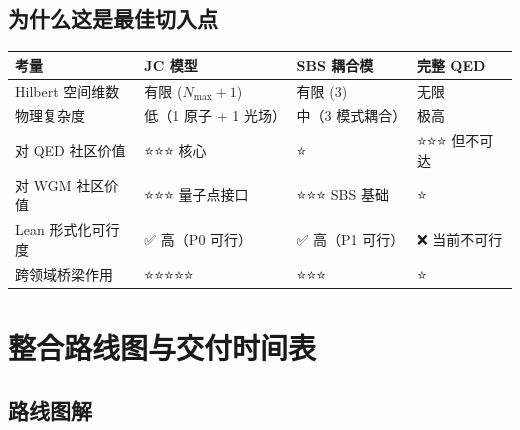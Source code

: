 \documentclass[
  11pt,
  a4paper,
]{ctexrep}
\newcounter{none} %
\begin{document}
\section{为什么这是最佳切入点}\label{ux4e3aux4ec0ux4e48ux8fd9ux662fux6700ux4f73ux5207ux5165ux70b9}

{\def\LTcaptype{none} %
\begin{longtable}[]{@{}
  >{\raggedright\arraybackslash}p{}
  >{\raggedright\arraybackslash}p{}
  >{\raggedright\arraybackslash}p{}
  >{\raggedright\arraybackslash}p{}@{}}
\toprule\noalign{}
\begin{minipage}[b]{\linewidth}\raggedright
考量
\end{minipage} & \begin{minipage}[b]{\linewidth}\raggedright
JC 模型
\end{minipage} & \begin{minipage}[b]{\linewidth}\raggedright
SBS 耦合模
\end{minipage} & \begin{minipage}[b]{\linewidth}\raggedright
完整 QED
\end{minipage} \\
\midrule\noalign{}
\endhead
\bottomrule\noalign{}
\endlastfoot
Hilbert 空间维数 & 有限 (\(N_{\text{max}}+1\)) & 有限 (3) & 无限 \\
物理复杂度 & 低（1 原子 + 1 光场） & 中（3 模式耦合） & 极高 \\
对 QED 社区价值 & ⭐⭐⭐ 核心 & ⭐ & ⭐⭐⭐ 但不可达 \\
对 WGM 社区价值 & ⭐⭐⭐ 量子点接口 & ⭐⭐⭐ SBS 基础 & ⭐ \\
Lean 形式化可行度 & ✅ 高（P0 可行） & ✅ 高（P1 可行） & ❌
当前不可行 \\
跨领域桥梁作用 & ⭐⭐⭐⭐⭐ & ⭐⭐⭐ & ⭐ \\
\end{longtable}
}


\chapter{整合路线图与交付时间表}\label{ux6574ux5408ux8defux7ebfux56feux4e0eux4ea4ux4ed8ux65f6ux95f4ux8868}

\section{路线图解}\label{ux8defux7ebfux56feux89e3}
\end{document}
